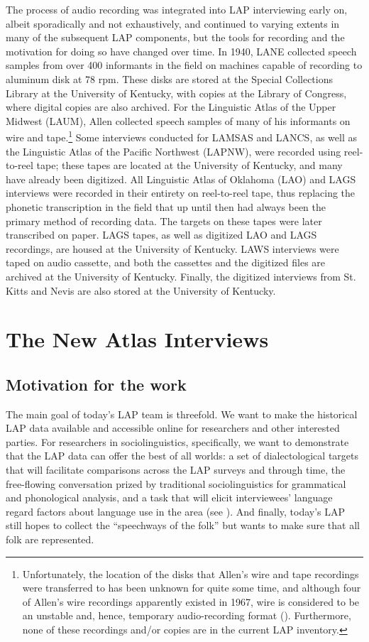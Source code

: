 \documentclass[output=paper]{langscibook}
\begin{document}
The process of audio recording was integrated into LAP interviewing early on, albeit sporadically and not exhaustively, and continued to varying extents in many of the subsequent LAP components, but the tools for recording and the motivation for doing so have changed over time. In 1940, LANE collected speech samples from over 400 informants in the field on machines capable of recording to aluminum disk at 78 rpm. These disks are stored at the Special Collections Library at the University of Kentucky, with copies at the Library of Congress, where digital copies are also archived. For the Linguistic Atlas of the Upper Midwest (LAUM), Allen collected speech samples of many of his informants \citep[2--3]{Allen1973} on wire and tape.{\footnote{Unfortunately, the location of the disks that Allen’s wire and tape recordings were transferred to has been unknown for quite some time, and although four of Allen’s wire recordings apparently existed in 1967, wire is considered to be an unstable and, hence, temporary audio-recording format (\citealt[32--33]{Howren1967}). Furthermore, none of these recordings and/or copies are in the current LAP inventory.}} Some interviews conducted for LAMSAS and LANCS, as well as the Linguistic Atlas of the Pacific Northwest (LAPNW), were recorded using reel-to-reel tape; these tapes are located at the University of Kentucky, and many have already been digitized. All Linguistic Atlas of Oklahoma (LAO) and LAGS interviews were recorded in their entirety on reel-to-reel tape, thus replacing the phonetic transcription in the field that up until then had always been the primary method of recording data. The targets on these tapes were later transcribed on paper. LAGS tapes, as well as digitized LAO and LAGS recordings, are housed at the University of Kentucky. LAWS interviews were taped on audio cassette, and both the cassettes and the digitized files are archived at the University of Kentucky. Finally, the digitized interviews from St. Kitts and Nevis are also stored at the University of Kentucky.

\section{The New Atlas Interviews} %
\label{sec:burkette:3}
\subsection{Motivation for the work} %
\label{sec:burkette:3.1}
The main goal of today’s LAP team is threefold. We want to make the historical LAP data available and accessible online for researchers and other interested parties. For researchers in sociolinguistics, specifically, we want to demonstrate that the LAP data can offer the best of all worlds: a set of dialectological targets that will facilitate comparisons across the LAP surveys and through time, the free-flowing conversation prized by traditional sociolinguistics for grammatical and phonological analysis, and a task that will elicit interviewees’ language regard factors about language use in the area (see \citealt{Preston2018, Preston2019}). And finally, today’s LAP still hopes to collect the “speechways of the folk'' but wants to make sure that all folk are represented.
\end{document}
